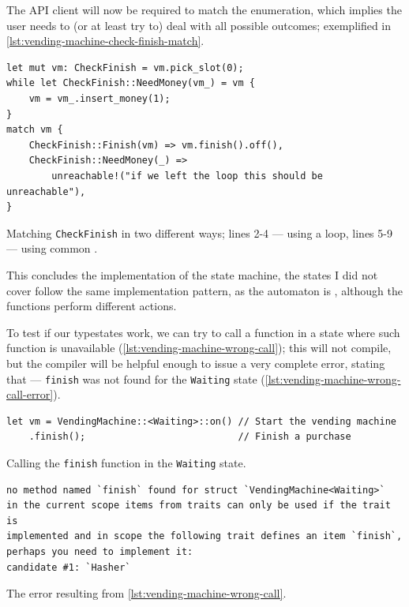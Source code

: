 The \gls{API} client will now be required to match the enumeration,
which implies the user needs to (or at least try to) deal with all possible outcomes;
exemplified in \autoref{lst:vending-machine-check-finish-match}.

\begin{listing}
    \begin{verbatim}
let mut vm: CheckFinish = vm.pick_slot(0);
while let CheckFinish::NeedMoney(vm_) = vm {
    vm = vm_.insert_money(1);
}
match vm {
    CheckFinish::Finish(vm) => vm.finish().off(),
    CheckFinish::NeedMoney(_) =>
        unreachable!("if we left the loop this should be unreachable"),
}
\end{verbatim}
    \caption{
        Matching \texttt{CheckFinish} in two different ways;
        lines 2-4 --- using a  loop,
        lines 5-9 --- using common .
    }
    \label{lst:vending-machine-check-finish-match}
\end{listing}

This concludes the implementation of the state machine,
the states I did not cover follow the same implementation pattern,
as the automaton is , although the functions perform different actions.

To test if our typestates work, we can try to call a function in a state where such function is unavailable (\autoref{lst:vending-machine-wrong-call});
this will not compile, but the compiler will be helpful enough to issue a very complete error, stating that ---
\texttt{finish} was not found for the \texttt{Waiting} state (\autoref{lst:vending-machine-wrong-call-error}).

\begin{listing}
    \begin{verbatim}
let vm = VendingMachine::<Waiting>::on() // Start the vending machine
    .finish();                           // Finish a purchase
\end{verbatim}
    \caption{Calling the \texttt{finish} function in the \texttt{Waiting} state.}
    \label{lst:vending-machine-wrong-call}
\end{listing}

\begin{listing}
    \begin{verbatim}
no method named `finish` found for struct `VendingMachine<Waiting>`
in the current scope items from traits can only be used if the trait is
implemented and in scope the following trait defines an item `finish`,
perhaps you need to implement it:
candidate #1: `Hasher`
\end{verbatim}
    \caption{The error resulting from \autoref{lst:vending-machine-wrong-call}.}
    \label{lst:vending-machine-wrong-call-error}
\end{listing}

